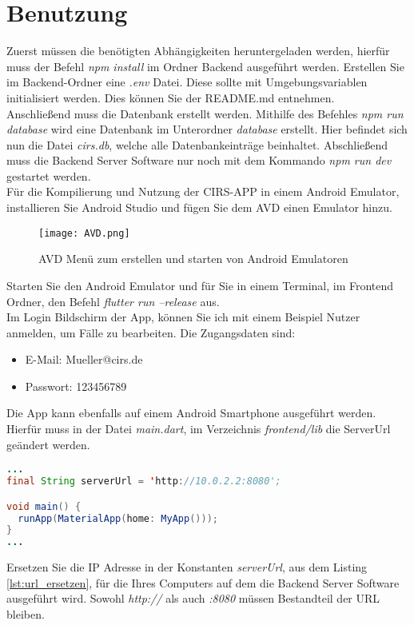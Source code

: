 \section{Benutzung}
\label{benutzung}
Zuerst müssen die benötigten Abhängigkeiten heruntergeladen werden, hierfür muss der Befehl \textit{npm install} im Ordner Backend ausgeführt werden. Erstellen Sie im Backend-Ordner eine \textit{.env} Datei. Diese sollte mit Umgebungsvariablen initialisiert werden. Dies können Sie der README.md entnehmen.\\
Anschließend muss die Datenbank erstellt werden. Mithilfe des Befehles \textit{npm run database} wird eine Datenbank im Unterordner \textit{database} erstellt. Hier befindet sich nun die Datei \textit{cirs.db}, welche alle Datenbankeinträge beinhaltet. Abschließend muss die Backend Server Software nur noch mit dem Kommando \textit{npm run dev} gestartet werden.
\\[0.5cm]
Für die Kompilierung und Nutzung der CIRS-APP in einem Android Emulator, installieren Sie Android Studio und fügen Sie dem AVD einen Emulator hinzu.
\begin{figure}[hbt!]
\texttt{[image: AVD.png]}
\caption{AVD Menü zum erstellen und starten von Android Emulatoren}
\label{fig:avd}
\end{figure}
Starten Sie den Android Emulator und für Sie in einem Terminal, im Frontend Ordner, den Befehl \textit{flutter run --release} aus.
\\[0.5cm]
Im Login Bildschirm der App, können Sie ich mit einem Beispiel Nutzer anmelden, um Fälle zu bearbeiten. Die Zugangsdaten sind:
\begin{itemize}
\item E-Mail: Mueller@cirs.de
\item Passwort: 123456789
\end{itemize}
Die App kann ebenfalls auf einem Android Smartphone ausgeführt werden. Hierfür muss in der Datei \textit{main.dart}, im Verzeichnis \textit{frontend/lib} die ServerUrl geändert werden.
\begin{lstlisting}[language=Java, caption=ServerUrl ersetzen, label=lst:url_ersetzen]
...
final String serverUrl = 'http://10.0.2.2:8080';

void main() {
  runApp(MaterialApp(home: MyApp()));
}
...
\end{lstlisting}
Ersetzen Sie die IP Adresse in der Konstanten \textit{serverUrl}, aus dem Listing \ref{lst:url_ersetzen}, für die Ihres Computers auf dem die Backend Server Software ausgeführt wird. Sowohl \textit{http://} als auch \textit{:8080} müssen Bestandteil der URL bleiben.
